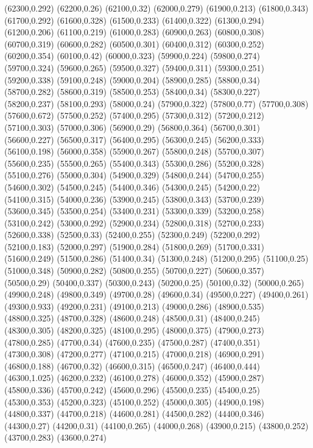 (62300,0.292)
(62200,0.26)
(62100,0.32)
(62000,0.279)
(61900,0.213)
(61800,0.343)
(61700,0.292)
(61600,0.328)
(61500,0.233)
(61400,0.322)
(61300,0.294)
(61200,0.206)
(61100,0.219)
(61000,0.283)
(60900,0.263)
(60800,0.308)
(60700,0.319)
(60600,0.282)
(60500,0.301)
(60400,0.312)
(60300,0.252)
(60200,0.354)
(60100,0.42)
(60000,0.323)
(59900,0.224)
(59800,0.274)
(59700,0.324)
(59600,0.265)
(59500,0.327)
(59400,0.311)
(59300,0.251)
(59200,0.338)
(59100,0.248)
(59000,0.204)
(58900,0.285)
(58800,0.34)
(58700,0.282)
(58600,0.319)
(58500,0.253)
(58400,0.34)
(58300,0.227)
(58200,0.237)
(58100,0.293)
(58000,0.24)
(57900,0.322)
(57800,0.77)
(57700,0.308)
(57600,0.672)
(57500,0.252)
(57400,0.295)
(57300,0.312)
(57200,0.212)
(57100,0.303)
(57000,0.306)
(56900,0.29)
(56800,0.364)
(56700,0.301)
(56600,0.227)
(56500,0.317)
(56400,0.295)
(56300,0.245)
(56200,0.333)
(56100,0.198)
(56000,0.358)
(55900,0.267)
(55800,0.248)
(55700,0.307)
(55600,0.235)
(55500,0.265)
(55400,0.343)
(55300,0.286)
(55200,0.328)
(55100,0.276)
(55000,0.304)
(54900,0.329)
(54800,0.244)
(54700,0.255)
(54600,0.302)
(54500,0.245)
(54400,0.346)
(54300,0.245)
(54200,0.22)
(54100,0.315)
(54000,0.236)
(53900,0.245)
(53800,0.343)
(53700,0.239)
(53600,0.345)
(53500,0.254)
(53400,0.231)
(53300,0.339)
(53200,0.258)
(53100,0.242)
(53000,0.292)
(52900,0.234)
(52800,0.318)
(52700,0.233)
(52600,0.338)
(52500,0.33)
(52400,0.255)
(52300,0.249)
(52200,0.292)
(52100,0.183)
(52000,0.297)
(51900,0.284)
(51800,0.269)
(51700,0.331)
(51600,0.249)
(51500,0.286)
(51400,0.34)
(51300,0.248)
(51200,0.295)
(51100,0.25)
(51000,0.348)
(50900,0.282)
(50800,0.255)
(50700,0.227)
(50600,0.357)
(50500,0.29)
(50400,0.337)
(50300,0.243)
(50200,0.25)
(50100,0.32)
(50000,0.265)
(49900,0.248)
(49800,0.349)
(49700,0.28)
(49600,0.34)
(49500,0.227)
(49400,0.261)
(49300,0.933)
(49200,0.231)
(49100,0.213)
(49000,0.286)
(48900,0.535)
(48800,0.325)
(48700,0.328)
(48600,0.248)
(48500,0.31)
(48400,0.245)
(48300,0.305)
(48200,0.325)
(48100,0.295)
(48000,0.375)
(47900,0.273)
(47800,0.285)
(47700,0.34)
(47600,0.235)
(47500,0.287)
(47400,0.351)
(47300,0.308)
(47200,0.277)
(47100,0.215)
(47000,0.218)
(46900,0.291)
(46800,0.188)
(46700,0.32)
(46600,0.315)
(46500,0.247)
(46400,0.444)
(46300,1.025)
(46200,0.232)
(46100,0.278)
(46000,0.352)
(45900,0.287)
(45800,0.336)
(45700,0.242)
(45600,0.296)
(45500,0.235)
(45400,0.25)
(45300,0.353)
(45200,0.323)
(45100,0.252)
(45000,0.305)
(44900,0.198)
(44800,0.337)
(44700,0.218)
(44600,0.281)
(44500,0.282)
(44400,0.346)
(44300,0.27)
(44200,0.31)
(44100,0.265)
(44000,0.268)
(43900,0.215)
(43800,0.252)
(43700,0.283)
(43600,0.274)
